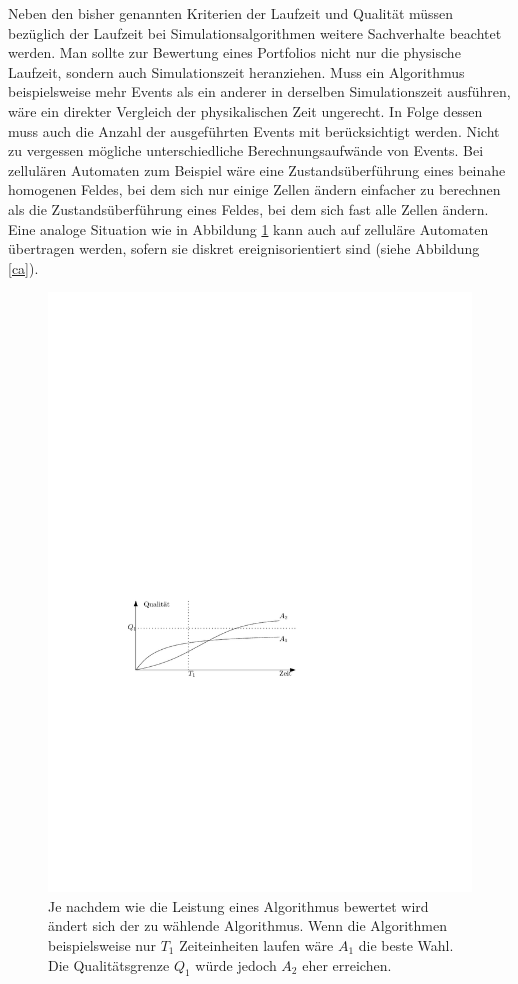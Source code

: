 Neben den bisher genannten Kriterien der Laufzeit und Qualität müssen bezüglich der Laufzeit bei Simulationsalgorithmen weitere Sachverhalte beachtet werden. Man sollte zur Bewertung eines Portfolios nicht nur die physische Laufzeit, sondern auch Simulationszeit heranziehen. Muss ein Algorithmus beispielsweise mehr Events als ein anderer in derselben Simulationszeit ausführen, wäre ein direkter Vergleich der physikalischen Zeit ungerecht. In Folge dessen muss auch die Anzahl der ausgeführten Events mit berücksichtigt werden. Nicht zu vergessen mögliche unterschiedliche Berechnungsaufwände von Events. Bei zellulären Automaten zum Beispiel wäre eine Zustandsüberführung eines beinahe homogenen Feldes, bei dem sich nur einige Zellen ändern einfacher zu berechnen als die Zustandsüberführung eines Feldes, bei dem sich fast alle Zellen ändern. Eine analoge Situation wie in Abbildung \ref{optimizationproblem} kann auch auf zelluläre Automaten übertragen werden, sofern sie diskret ereignisorientiert sind (siehe Abbildung \ref{ca}).

\begin{figure}[h]
\centering
\includegraphics{timevsoptimum.pdf}
\caption[Optimierungsproblem]{Je nachdem wie die Leistung eines Algorithmus bewertet wird ändert sich der zu wählende Algorithmus. Wenn die Algorithmen beispielsweise nur $T_1$ Zeiteinheiten laufen wäre $A_1$ die beste Wahl. Die Qualitätsgrenze $Q_1$ würde jedoch $A_2$ eher erreichen.}
\label{optimizationproblem}
\end{figure}

